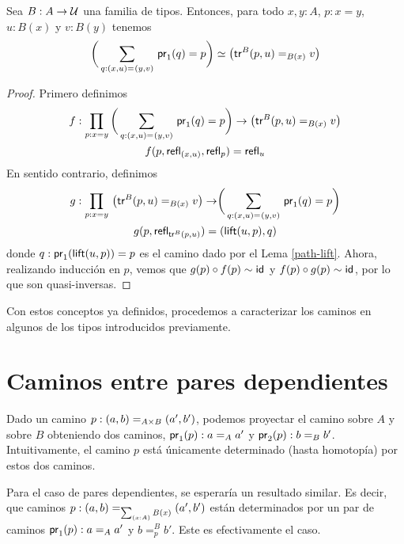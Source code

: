 \documentclass[../main.tex]{subfiles}
\begin{document}
\begin{proposition}\label{paths-over-def}
  Sea $B:A \to \UU$ una familia de tipos. Entonces, para todo $x,y:A$, $p:x=y$, $u:B(x)$ y $v:B(y)$ tenemos
  \[ \eqv{\biggr(\sm{q:\id{(x,u)}{(y,v)}}\fst(q)=p\biggr)}{\left(\id[B(x)]{\trfib{B}{p}{u}}{v}\right)} \]
\end{proposition}
\begin{proof}
  Primero definimos
  \begin{gather*}
    f : \prd{p:x=y} \biggr(\sm{q:\id{(x,u)}{(y,v)}}\fst(q)=p\biggr) \to \left(\id[B(x)]{\trfib{B}{p}{u}}{v}\right) \\
    f(p, \refl{(x,u)}, \refl{p}) = \refl{u}
  \end{gather*}
  En sentido contrario, definimos
  \begin{gather*}
    g : \prd{p:x=y} \left(\id[B(x)]{\trfib{B}{p}{u}}{v}\right) \to \biggr(\sm{q:\id{(x,u)}{(y,v)}}\fst(q)=p\biggr) \\
    g(p, \refl{\trfib{B}{p}{u}}) = (\mathsf{lift}(u,p) , q)
  \end{gather*}
  donde $q: \fst(\mathsf{lift}(u,p))=p$ es el camino dado por el Lema \ref{path-lift}.
  Ahora, realizando inducci\'on en $p$, vemos que $g(p) \circ f(p) \htpy \idfunc$ y $f(p) \circ g(p) \htpy \idfunc$, por lo que son quasi-inversas.
\end{proof}

Con estos conceptos ya definidos, procedemos a caracterizar los caminos en algunos de los tipos introducidos previamente.


\section{Caminos entre pares dependientes}
Dado un camino $p:\id[A\times B]{(a,b)}{(a',b')}$, podemos proyectar el camino sobre $A$ y sobre $B$ obteniendo dos caminos, $\ap{\proj1}p:\id[A]{a}{a'}$ y $\ap{\proj2}p:\id[B]{b}{b'}$.
Intuitivamente, el camino $p$ est\'a \'unicamente determinado (hasta homotop\'ia) por estos dos caminos.

Para el caso de pares dependientes, se esperar\'ia un resultado similar. Es decir, que caminos $p:\id[\sm{x:A}B(x)]{(a,b)}{(a',b')}$ est\'an determinados por un par de caminos $\fst(p):\id[A]{a}{a'}$ y $b=^B_p b'$.
Este es efectivamente el caso.
\end{document}
